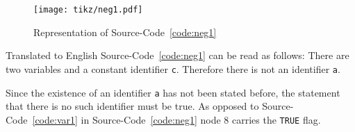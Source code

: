 \documentclass[british]{article}
\newcommand\prv{bc}
\newcommand\m[1]{\texttt{#1}}
\newenvironment{code}{\captionsetup{type=listing}}{}
\newcommand\scref[1]{Source-Code~\ref{code:#1}}
\begin{document}
\begin{code}
\label{code:neg1}
\inputminted[linenos]{\prv}{examples/neg1.prove}
\end{code}

\begin{figure}[!h]
\caption{Representation of \scref{neg1}}\label{fig:neg1}
\centering
\texttt{[image: tikz/neg1.pdf]}
\end{figure}

Translated to English \scref{neg1} can be read as follows: There are two variables and a constant identifier \m{c}. Therefore there is not an identifier \m{a}.
\newline

Since the existence of an identifier \m{a} has not been stated before, the statement that there is no such identifier must be true. As opposed to \scref{var1} in \scref{neg1} node 8 carries the \texttt{TRUE} flag.

\pagebreak{}

\begingroup
{}
\setlength\bibitemsep{10pt}
\printbibliography\
\endgroup
\end{document}
